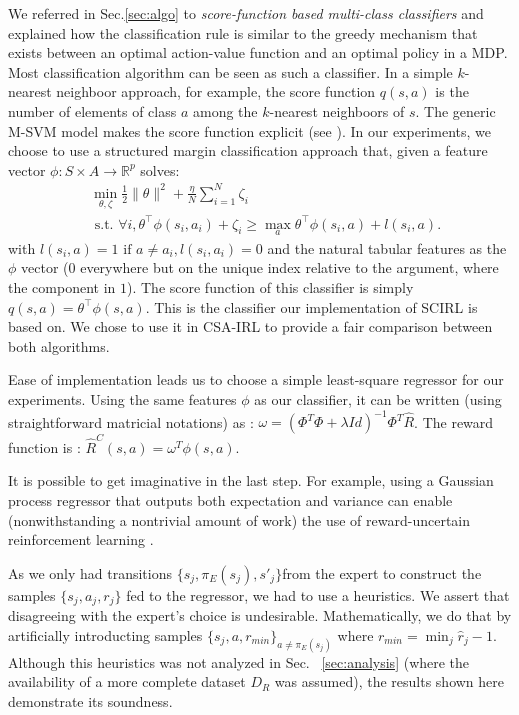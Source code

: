 \documentclass[smallextended]{svjour3}
\begin{document}
We referred in Sec.\ref{sec:algo} to \emph{score-function based multi-class classifiers} and explained how the classification rule is similar to the greedy mechanism that exists between an optimal action-value function and an optimal policy in a MDP. Most classification algorithm can be seen as such a classifier. In a simple $k$-nearest neighboor approach, for example, the score function $q(s,a)$ is the number of elements of class $a$ among the $k$-nearest neighboors of $s$. The generic M-SVM model makes the score function explicit (see \cite{guermeur2011generic}). In our experiments, we choose to use a structured margin classification approach \cite{taskar2005learning} that, given a feature vector $\phi : S\times A \rightarrow \mathbb{R}^p$ solves:
\begin{eqnarray*}
  &\min_{\theta,\zeta}\frac{1}{2}\|\theta\|^2 +
  \frac{\eta}{N}\sum_{i=1}^N \zeta_i \\
  &\text{~s.t.~} \forall i,
  \theta^\top{\phi}(s_i,a_i)+\zeta_i \geq \max_a \theta^\top
  {\phi}(s_i,a) + l(s_i,a). \label{eq:qp_taskar}
\end{eqnarray*}
with $l(s_i,a) = 1\textrm{ if } a\neq a_i,l(s_i,a_i)=0$ and the natural tabular features as the $\phi$ vector ($0$ everywhere but on the unique index relative to the argument, where the component in $1$). The score function of this classifier is simply $q(s,a) = \theta^\top \phi(s,a)$. This is the classifier our implementation of SCIRL \cite{klein2012scirl} is based on. We chose to use it in CSA-IRL to provide a fair comparison between both algorithms.

Ease of implementation leads us to choose a simple least-square regressor for our experiments. Using the same features $\phi$ as our classifier, it can be written (using straightforward matricial notations) as :  $\omega = (\Phi^T\Phi + \lambda Id)^{-1}\Phi^T\hat R$. The reward function is : $\hat R^C(s,a) = \omega^T \phi(s,a)$.

It is possible to get imaginative in the last step. For example, using a Gaussian process regressor \cite{rasmussen2006gaussian} that outputs both expectation and variance can enable (nonwithstanding a nontrivial amount of work) the use of reward-uncertain reinforcement learning \cite{regan2011robust}. 

As we only had transitions $\{s_j,\pi_E(s_j),s'_j\}$from the expert to construct the samples $\{s_j,a_j,r_j\}$ fed to the regressor, we had to use a heuristics. We assert that disagreeing with the expert's choice is undesirable. Mathematically, we do that by artificially introducting samples $\{s_j,a,r_{min}\}_{a\neq \pi_E(s_j)}$ where $r_{min} = \min_j\hat r_j - 1$. Although this heuristics was not analyzed in Sec.~ \ref{sec:analysis} (where the availability of a more complete dataset $D_R$ was assumed), the results shown here demonstrate its soundness.
\end{document}
